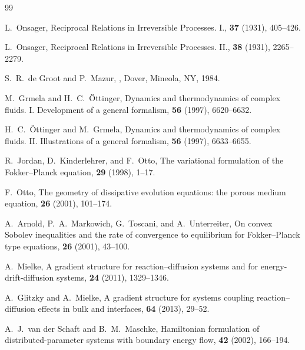 \documentclass[11pt]{article}
\begin{document}
\begin{thebibliography}{99}

L.~Onsager,
\newblock Reciprocal Relations in Irreversible Processes. I.,
 \textbf{37} (1931), 405--426.

L.~Onsager,
\newblock Reciprocal Relations in Irreversible Processes. II.,
 \textbf{38} (1931), 2265--2279.

S.~R.~de Groot and P.~Mazur,
,
\newblock Dover, Mineola, NY, 1984.

M.~Grmela and H.~C.~\"Ottinger,
\newblock Dynamics and thermodynamics of complex fluids. I. Development of a general formalism,
 \textbf{56} (1997), 6620--6632.

H.~C.~\"Ottinger and M.~Grmela,
\newblock Dynamics and thermodynamics of complex fluids. II. Illustrations of a general formalism,
 \textbf{56} (1997), 6633--6655.

R.~Jordan, D.~Kinderlehrer, and F.~Otto,
\newblock The variational formulation of the Fokker--Planck equation,
 \textbf{29} (1998), 1--17.

F.~Otto,
\newblock The geometry of dissipative evolution equations: the porous medium equation,
 \textbf{26} (2001), 101--174.

A.~Arnold, P.~A.~Markowich, G.~Toscani, and A.~Unterreiter,
\newblock On convex Sobolev inequalities and the rate of convergence to equilibrium for Fokker--Planck type equations,
 \textbf{26} (2001), 43--100.

A.~Mielke,
\newblock A gradient structure for reaction--diffusion systems and for energy-drift-diffusion systems,
 \textbf{24} (2011), 1329--1346.

A.~Glitzky and A.~Mielke,
\newblock A gradient structure for systems coupling reaction--diffusion effects in bulk and interfaces,
 \textbf{64} (2013), 29--52.

A.~J.~van der Schaft and B.~M.~Maschke,
\newblock Hamiltonian formulation of distributed-parameter systems with boundary energy flow,
 \textbf{42} (2002), 166--194.


\end{thebibliography}
\end{document}
